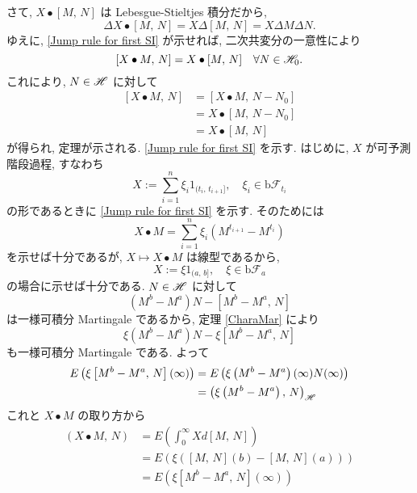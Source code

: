 \documentclass{ltjsarticle}
\begin{document}
\begin{prf}
	さて, \( X \bullet [M,\,N] \) は Lebesgue-Stieltjes 積分だから,
	\[
		\Delta X \bullet [M,\,N] = X \Delta [M,\,N] = X\Delta M \Delta N.
	\]
	ゆえに, \eqref{Jump rule for first SI} が示せれば, 二次共変分の一意性により
	\[
		[ X \bullet M,\, N ] = X \bullet [M,\,N]	\quad \forall N \in \mathscr{H}_0.
	\]
	これにより, \( N \in \mathscr{H} \) に対して
	\begin{equation}
		\begin{aligned}
			[ X \bullet M,\, N ] & =	[ X \bullet M,\, N - N_0 ] \\
			                     & =	X \bullet [M,\, N - N_0 ]  \\
			                     & =	 X \bullet [M,\,N]
		\end{aligned}
	\end{equation}
	が得られ, 定理が示される.
	\eqref{Jump rule for first SI} を示す.
	はじめに, \( X \) が可予測階段過程, すなわち
	\begin{equation} \label{PredStep}
		X := \sum_{ i = 1 }^n \xi_i 1_{(t_i,\, t_{ i + 1 }]},
		\quad	\xi_i \in \mathrm{b}\mathscr{F}_{t_i}
	\end{equation}
	の形であるときに \eqref{Jump rule for first SI} を示す. そのためには
	\[
		X \bullet M = \sum_{ i = 1}^n \xi_i \left( M^{t_{ i + 1}} - M^{t_i} \right)
	\]
	を示せば十分であるが, \( X \mapsto X \bullet M \) は線型であるから,
	\[
		X := \xi 1_{(a,\, b]},\quad	\xi \in \mathrm{b}\mathscr{F}_a
	\]
	の場合に示せば十分である.
	\( N \in \mathscr{H} \) に対して
	\[
		\left( M^b - M^a \right)N - \left[M^b - M^a,\, N \right]
	\]
	は一様可積分 Martingale であるから, 定理 \ref{CharaMar} により
	\[
		\xi \left( M^b - M^a \right)N - \xi \left[M^b - M^a,\, N \right]
	\]
	も一様可積分 Martingale である. よって
	\begin{align*}
		E\left( \xi \left[M^b - M^a,\, N \right](\infty) \right)
		 & =	E\left( \xi \left( M^b - M^a \right) (\infty) N (\infty) \right)
		\\
		 & =	\left( \xi \left( M^b - M^a \right),\,N \right)_{\mathscr{H}}
	\end{align*}
	これと \( X \bullet M \) の取り方から
	\begin{equation}	
		\begin{aligned}
			( X \bullet M,\, N ) & =	E \left( \int_0^{\infty} X d[M,\,N] \right)                  \\
			                     & =	E\left( \xi \left( [M,\, N](b) - [M,\, N](a) \right) \right) \\
			                     & =	E\left( \xi \left[M^b - M^a,\, N \right](\infty) \right)     \\

\end{aligned}
\end{equation}
\end{prf}
\end{document}
